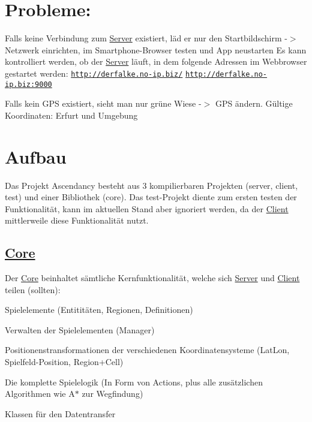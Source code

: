 \section*{Probleme\+:}


\begin{DoxyItemize}
\item Falls keine Verbindung zum \hyperlink{namespaceServer}{Server} existiert, läd er nur den Startbildschirm -\/$>$ Netzwerk einrichten, im Smartphone-\/\+Browser testen und App neustarten Es kann kontrolliert werden, ob der \hyperlink{namespaceServer}{Server} läuft, in dem folgende Adressen im Webbrowser gestartet werden\+: \href{http://derfalke.no-ip.biz/}{\tt http\+://derfalke.\+no-\/ip.\+biz/} \href{http://derfalke.no-ip.biz:9000}{\tt http\+://derfalke.\+no-\/ip.\+biz\+:9000}
\item Falls kein G\+P\+S existiert, sieht man nur grüne Wiese -\/$>$ G\+P\+S ändern. Gültige Koordinaten\+: Erfurt und Umgebung
\end{DoxyItemize}

\section*{Aufbau}

Das Projekt Ascendancy besteht aus 3 kompilierbaren Projekten (server, client, test) und einer Bibliothek (core). Das test-\/\+Projekt diente zum ersten testen der Funktionalität, kann im aktuellen Stand aber ignoriert werden, da der \hyperlink{namespaceClient}{Client} mittlerweile diese Funktionalität nutzt.

\subsection*{\hyperlink{namespaceCore}{Core}}

Der \hyperlink{namespaceCore}{Core} beinhaltet sämtliche Kernfunktionalität, welche sich \hyperlink{namespaceServer}{Server} und \hyperlink{namespaceClient}{Client} teilen (sollten)\+:
\begin{DoxyItemize}
\item Spielelemente (Entititäten, Regionen, Definitionen)
\item Verwalten der Spielelementen (Manager)
\item Positionenstransformationen der verschiedenen Koordinatensysteme (Lat\+Lon, Spielfeld-\/\+Position, Region+\+Cell)
\item Die komplette Spielelogik (In Form von Actions, plus alle zusätzlichen Algorithmen wie A$\ast$ zur Wegfindung)
\item Klassen für den Datentransfer
\end{DoxyItemize}


